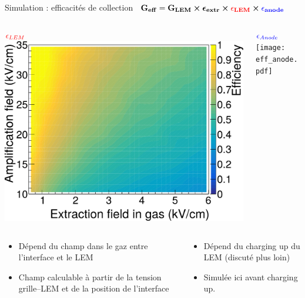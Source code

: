     \begin{frame}{Simulation : efficacités de collection}
        \hbox{
     		$\mathbf{G_{eff}=G_{LEM}\boldsymbol{\times}\boldsymbol{\epsilon}_{extr} \boldsymbol{\times}\textcolor{red}{\epsilon_{LEM}}\boldsymbol{\times} \textcolor{blue}{\epsilon_{anode}}}$
     	}
   		\begin{columns}
            \begin{column}{0.5\textwidth}
                \centering $\textcolor{red}{\epsilon_{LEM}}$
                \includegraphics[width=\textwidth]{./pictures/eff_lem_alone.pdf}
            \end{column}\hfill
            \begin{column}{0.5\textwidth}
                \centering $\textcolor{blue}{\epsilon_{Anode}}$
                \texttt{[image: eff\_anode.pdf]}
            \end{column}
        \end{columns}
   		\begin{columns}
            \begin{column}{0.5\textwidth}
                \begin{scriptsize}
                    \begin{itemize}
                        \item Dépend du champ dans le gaz entre l'interface et le LEM
                        \item Champ calculable à partir de la tension grille--LEM et de la position de l'interface
                    \end{itemize}
                \end{scriptsize}
            \end{column}\hfill
            \begin{column}{0.5\textwidth}
                \begin{itemize}
                    \item Dépend du charging up du LEM (discuté plus loin)
                    \item Simulée ici avant charging up.
                \end{itemize}
            \end{column}
        \end{columns}
    \end{frame}
    
